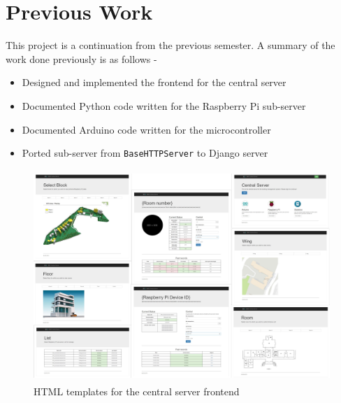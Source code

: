 \documentclass[letterpaper,11pt]{report}
\begin{document}
\chapter{Previous Work}\label{chapter:previouswork}
\onehalfspacing
This project is a continuation from the previous semester. A summary of the work done previously is as follows -
\begin{itemize}
    \item Designed and implemented the frontend for the central server
    \item Documented Python code written for the Raspberry Pi sub-server
    \item Documented Arduino code written for the microcontroller
    \item Ported sub-server from \verb|BaseHTTPServer| to Django server
\end{itemize}
\begin{figure}[h]
\includegraphics[width=12cm, height=8cm]{collage_edited}
\centering
\captionsetup{justification=centering}
\caption{HTML templates for the central server frontend}
\label{fig:collage_edited}
\end{figure}


\newpage
\end{document}
